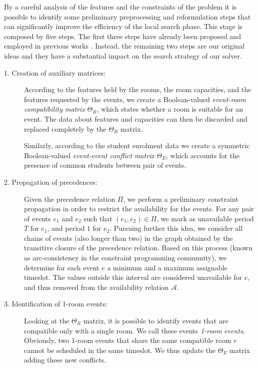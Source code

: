 \documentclass[authoryear,preprint,a4paper,12pt]{elsarticle}
\begin{document}
By a careful analysis of the features and the constraints of the
problem it is possible to identify some preliminary preprocessing and
reformulation steps that can significantly improve the efficiency of
the local search phase. This stage is composed by five steps. The
first three steps have already been proposed and employed in previous
works \citep[see, e.g.][]{Kost04}. Instead, the remaining two steps
are our original ideas and they have a substantial impact on the
search strategy of our solver.

\begin{description}

\item[1. Creation of auxiliary matrices:] According to the features held by
  the rooms, the room capacities, and the features requested by the
  events, we create a Boolean-valued \emph{event-room compatibility matrix} $\Theta_R$,
  which states whether a room is suitable for an event. 
  The data about features and capacities can then
  be discarded and replaced completely by the $\Theta_R$ matrix.

  Similarly, according to the student enrolment data we create a symmetric Boolean-valued
  \emph{event-event conflict matrix} $\Theta_E$, which 
  accounts for the presence of common students between pair of events.

\item[2. Propagation of precedences:] Given the precedence relation
  $\Pi$, we perform a preliminary constraint propagation in order to
  restrict the availability for the events.  For any pair of events
  $e_1$ and $e_2$ such that $(e_1,e_2)\in \Pi$, we mark as unavailable
  period $T$ for $e_1$, and period $1$ for $e_2$.  Pursuing further
  this idea, we consider all chains of events (also longer than two)
  in the graph obtained by the transitive closure of the precedence
  relation.  Based on this process (known as arc-consistency in the
  constraint programming community), we determine for each event $e$ a
  minimum and a maximum assignable timeslot. The values outside this
  interval are considered unavailable for $e$, and thus removed from
  the availability relation $\mathcal{A}$.

\item[3. Identification of 1-room events:] Looking at the $\Theta_R$ matrix, it is
  possible to identify events that are compatible only with a single room. We call these events \emph{1-room events}. Obviously, two 1-room events that share the same
  compatible room $r$ cannot be scheduled in the same timeslot. We
  thus update the $\Theta_E$ matrix adding these new conflicts.


\end{description}
\end{document}
